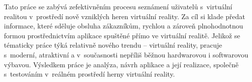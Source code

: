 Tato práce se zabývá zefektivněním procesu seznámení uživatelů
s~virtuální realitou v~prostředí nově vzniklých heren virtuální reality.
Za cíl si klade předat informace, které sděluje obsluha zákazníkům,
rychlou a zároveň plnohodnotnou formou prostřednictvím aplikace spuštěné
přímo ve virtuální realitě. Jelikož se tématicky práce týká relativně
nového trendu -- virtuální reality, pracuje s~moderní, atraktivní a
v~současnosti nepříliš běžnou hardwarovou i softwarovou výbavou. Výsledkem
práce je analýza, návrh aplikace a její realizace, společně s~testováním
v~reálném prostředí herny virtuální reality.
